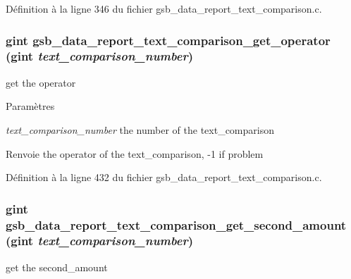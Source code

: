 Définition à la ligne 346 du fichier gsb\_\-data\_\-report\_\-text\_\-comparison.c.

\subsubsection[{gsb\_\-data\_\-report\_\-text\_\-comparison\_\-get\_\-operator}]{\setlength{\rightskip}{0pt plus 5cm}gint gsb\_\-data\_\-report\_\-text\_\-comparison\_\-get\_\-operator (gint {\em text\_\-comparison\_\-number})}\label{gsb__data__report__text__comparison_8c_a456a9c966f4efc5af7aadca4d09f1b2a}
get the operator


\begin{DoxyParams}{Paramètres}
\item[{\em text\_\-comparison\_\-number}]the number of the text\_\-comparison\end{DoxyParams}
\begin{DoxyReturn}{Renvoie}
the operator of the text\_\-comparison, -\/1 if problem 
\end{DoxyReturn}


Définition à la ligne 432 du fichier gsb\_\-data\_\-report\_\-text\_\-comparison.c.

\subsubsection[{gsb\_\-data\_\-report\_\-text\_\-comparison\_\-get\_\-second\_\-amount}]{\setlength{\rightskip}{0pt plus 5cm}gint gsb\_\-data\_\-report\_\-text\_\-comparison\_\-get\_\-second\_\-amount (gint {\em text\_\-comparison\_\-number})}\label{gsb__data__report__text__comparison_8c_aeb73733ca155c44e7991f967eea4205f}
get the second\_\-amount


